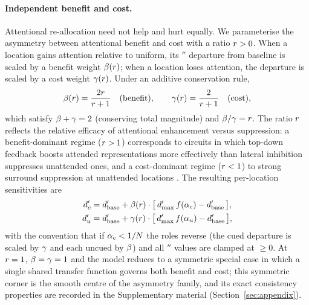 \paragraph{Independent benefit and cost.}
Attentional re-allocation need not help and hurt equally. We
parameterise the asymmetry between attentional benefit and cost with a
ratio $r > 0$. When a location gains attention relative to uniform,
its $\dprime$ departure from baseline is scaled by a benefit weight
$\beta(r)$; when a location loses attention, the departure is
scaled by a cost weight $\gamma(r)$. Under an additive
conservation rule,
\begin{equation}
  \beta(r) = \frac{2r}{r + 1}
  \quad\text{(benefit)},
  \qquad
  \gamma(r) = \frac{2}{r + 1}
  \quad\text{(cost)},
  \label{eq:beta-gamma}
\end{equation}
which satisfy $\beta + \gamma = 2$ (conserving total magnitude) and
$\beta/\gamma = r$. The ratio $r$ reflects the relative
efficacy of attentional enhancement versus suppression: a
benefit-dominant regime ($r > 1$) corresponds to circuits in which
top-down feedback boosts attended representations more effectively than
lateral inhibition suppresses unattended ones, and a cost-dominant
regime ($r < 1$) to strong surround suppression at unattended
locations \cite{reynolds_heeger2009_normalization,
treue_martinez_trujillo1999_feature_attention,
mcadams_maunsell1999_v4_tuning}. The resulting per-location sensitivities
are
\begin{align}
  d'_c
    &= d'_{\mathrm{base}}
       + \beta(r) \cdot
       \big[\, d'_{\max}\, f(\alpha_c) - d'_{\mathrm{base}} \,\big],
  \label{eq:dprime-cued}\\
  d'_u
    &= d'_{\mathrm{base}}
       + \gamma(r) \cdot
       \big[\, d'_{\max}\, f(\alpha_u) - d'_{\mathrm{base}} \,\big],
  \label{eq:dprime-uncued}
\end{align}
with the convention that if $\alpha_c < 1/N$ the roles reverse
(the cued departure is scaled by $\gamma$ and each uncued by $\beta$)
and all $\dprime$ values are clamped at $\ge 0$. At $r = 1$,
$\beta = \gamma = 1$ and the model reduces to a symmetric special case
in which a single shared transfer function governs both benefit and
cost; this symmetric corner is the smooth centre of the asymmetry
family, and its exact consistency properties are recorded in the
Supplementary material (Section~\ref{sec:appendix}).

